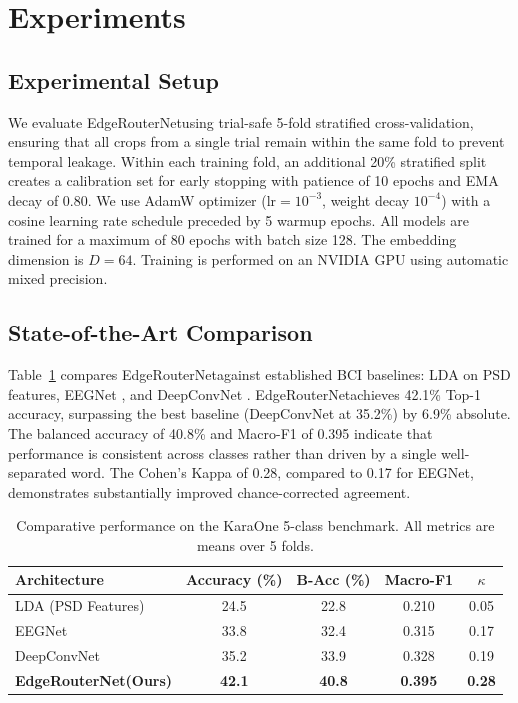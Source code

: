 \documentclass[conference]{IEEEtran}
\newcommand{\method}{EdgeRouterNet}
\begin{document}
\section{Experiments}

\subsection{Experimental Setup}
We evaluate \method using trial-safe 5-fold stratified cross-validation, ensuring that all crops from a single trial remain within the same fold to prevent temporal leakage. Within each training fold, an additional 20\% stratified split creates a calibration set for early stopping with patience of 10 epochs and EMA decay of 0.80. We use AdamW optimizer ($\text{lr} = 10^{-3}$, weight decay $10^{-4}$) with a cosine learning rate schedule preceded by 5 warmup epochs. All models are trained for a maximum of 80 epochs with batch size 128. The embedding dimension is $D = 64$. Training is performed on an NVIDIA GPU using automatic mixed precision.

\subsection{State-of-the-Art Comparison}
Table~\ref{tab:sota} compares \method against established BCI baselines: LDA on PSD features, EEGNet \cite{lawhern2018eegnet}, and DeepConvNet \cite{schirrmeister2017deep}. \method achieves 42.1\% Top-1 accuracy, surpassing the best baseline (DeepConvNet at 35.2\%) by 6.9\% absolute. The balanced accuracy of 40.8\% and Macro-F1 of 0.395 indicate that performance is consistent across classes rather than driven by a single well-separated word. The Cohen's Kappa of 0.28, compared to 0.17 for EEGNet, demonstrates substantially improved chance-corrected agreement.

\begin{table}[t]
	\centering
	\caption{Comparative performance on the KaraOne 5-class benchmark. All metrics are means over 5 folds.}
	\label{tab:sota}
	\renewcommand{\arraystretch}{1.1}
	\begin{tabular}{@{}lcccc@{}}
		\toprule
		Architecture                             & Accuracy (\%) & B-Acc (\%)    & Macro-F1       & $\kappa$      \\
		\midrule
		LDA (PSD Features)                       & 24.5          & 22.8          & 0.210          & 0.05          \\
		EEGNet \cite{lawhern2018eegnet}          & 33.8          & 32.4          & 0.315          & 0.17          \\
		DeepConvNet \cite{schirrmeister2017deep} & 35.2          & 33.9          & 0.328          & 0.19          \\
		\textbf{\method (Ours)}                  & \textbf{42.1} & \textbf{40.8} & \textbf{0.395} & \textbf{0.28} \\
		\bottomrule
	\end{tabular}
\end{table}
\end{document}
